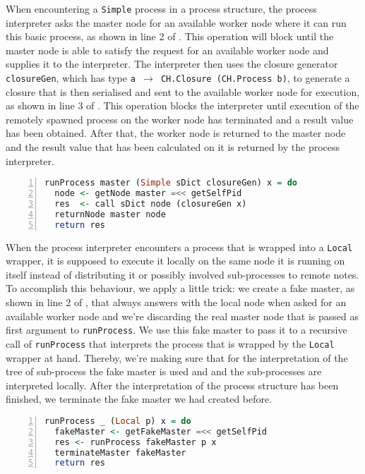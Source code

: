 When encountering a \texttt{Simple} process in a process structure, the process interpreter asks the master node for an available worker node where it can run this basic process, as shown in line 2 of . This operation will block until the master node is able to satisfy the request for an available worker node and supplies it to the interpreter. The interpreter then uses the closure generator \texttt{closureGen}, which has type \texttt{a $\to$ CH.Closure (CH.Process b)}, to generate a closure that is then serialised and sent to the available worker node for execution, as shown in line 3 of . This operation blocks the interpreter until execution of the remotely spawned process on the worker node has terminated and a result value has been obtained. After that, the worker node is returned to the master node and the result value that has been calculated on it is returned by the process interpreter.
\begin{lstlisting}[language=Haskell,caption=Implementation of the interpreter for \texttt{Simple} processes.,label=lst:runprocess_simple,numbers=left,frame=bt]
runProcess master (Simple sDict closureGen) x = do
  node <- getNode master =<< getSelfPid
  res  <- call sDict node (closureGen x)
  returnNode master node
  return res
\end{lstlisting}

When the process interpreter encounters a process that is wrapped into a \texttt{Local} wrapper, it is supposed to execute it locally on the same node it is running on itself instead of distributing it or possibly involved sub-processes to remote notes. To accomplish this behaviour, we apply a little trick: we create a fake master, as shown in line 2 of , that always answers with the local node when asked for an available worker node and we're discarding the real master node that is passed as first argument to \texttt{runProcess}. We use this fake master to pass it to a recursive call of \texttt{runProcess} that interprets the process that is wrapped by the \texttt{Local} wrapper at hand. Thereby, we're making sure that for the interpretation of the tree of sub-process the fake master is used and and the sub-processes are interpreted locally. After the interpretation of the process structure has been finished, we terminate the fake master we had created before.
\begin{lstlisting}[language=Haskell,caption=Implementation of the interpreter for \texttt{Local} processes.,label=lst:runprocess_local,numbers=left,frame=bt]
runProcess _ (Local p) x = do
  fakeMaster <- getFakeMaster =<< getSelfPid
  res <- runProcess fakeMaster p x
  terminateMaster fakeMaster
  return res
\end{lstlisting}

